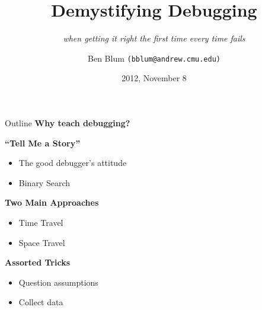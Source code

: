\documentclass[xcolor=dvipsnames]{beamer}
\title[Demystifying Debugging]{{\bf Demystifying Debugging}}
\subtitle[]{{\em when getting it right the first time every time fails}}
\author[Ben Blum]{Ben Blum \texttt{(bblum@andrew.cmu.edu)}}
\institute[98-172]{Great Practical Ideas for Computer Scientists}
\date[]{2012, November 8}
\begin{document}
\normalem
\begin{frame}
	\titlepage
\end{frame}


\newcommand\linegap{\vspace{0.2in}}
\newcommand\breakslide[1]{\begin{frame}{} \begin{center} \Large #1 \end{center} \end{frame}}
\newcommand\related[1]{\textsuperscript{\em [#1]}}
\newcommand\hilight[2]{\color{#1}#2\color{black}}


\begin{frame}{Outline}
	\textbf{Why teach debugging?}
	\linegap

	\textbf{``Tell Me a Story''}
	\begin{itemize}
		\item The good debugger's attitude
		\item Binary Search
	\end{itemize}
	\linegap

	{\bf Two Main Approaches}
	\begin{itemize}
		\item Time Travel
		\item Space Travel
	\end{itemize}
	\linegap

	{\bf Assorted Tricks}
	\begin{itemize}
		\item Question assumptions
		\item Collect data
	\end{itemize}
\end{frame}

\end{document}
